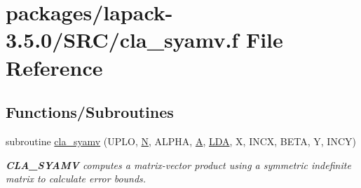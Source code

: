 \hypertarget{cla__syamv_8f}{}\section{packages/lapack-\/3.5.0/\+S\+R\+C/cla\+\_\+syamv.f File Reference}
\label{cla__syamv_8f}
\subsection*{Functions/\+Subroutines}
\begin{DoxyCompactItemize}
\item 
subroutine \hyperlink{group__complexSYcomputational_ga2effd037ac49e21caf28a78b063f41a3}{cla\+\_\+syamv} (U\+P\+L\+O, \hyperlink{polmisc_8c_a0240ac851181b84ac374872dc5434ee4}{N}, A\+L\+P\+H\+A, \hyperlink{classA}{A}, \hyperlink{example__user_8c_ae946da542ce0db94dced19b2ecefd1aa}{L\+D\+A}, X, I\+N\+C\+X, B\+E\+T\+A, Y, I\+N\+C\+Y)
\begin{DoxyCompactList}\small\item\em {\bfseries C\+L\+A\+\_\+\+S\+Y\+A\+M\+V} computes a matrix-\/vector product using a symmetric indefinite matrix to calculate error bounds. \end{DoxyCompactList}\end{DoxyCompactItemize}
